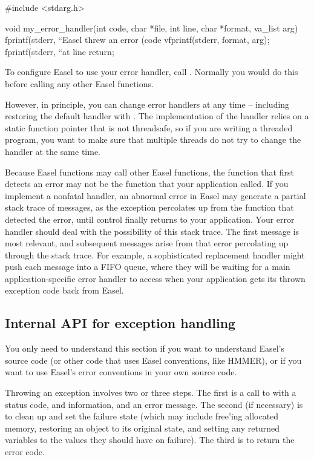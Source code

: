 \begin{cchunk}
#include <stdarg.h>

void
my_error_handler(int code, char *file, int line, char *format, va_list arg)
{
  fprintf(stderr, ``Easel threw an error (code %
  vfprintf(stderr, format, arg);
  fprintf(stderr, ``at line %
  return;
}
\end{cchunk}

To configure Easel to use your error handler, call
. Normally you
would do this before calling any other Easel functions.

However, in principle, you can change error handlers at any time --
including restoring the default handler with
.  The implementation of
the handler relies on a static function pointer that is not
threadsafe, so if you are writing a threaded program, you want to make
sure that multiple threads do not try to change the handler at the
same time.

Because Easel functions may call other Easel functions, the function
that first detects an error may not be the function that your
application called.  If you implement a nonfatal handler, an abnormal
error in Easel may generate a partial stack trace of
 messages, as the exception percolates up from the
function that detected the error, until control finally returns to
your application. Your error handler should deal with the possibility
of this stack trace. The first  message is most
relevant, and subsequent messages arise from that error percolating up
through the stack trace.  For example, a sophisticated replacement
 handler might push each 
message into a FIFO queue, where they will be waiting for a main
application-specific error handler to access when your application
gets its thrown exception code back from Easel.

\subsection{Internal API for exception handling}

You only need to understand this section if you want to understand
Easel's source code (or other code that uses Easel conventions, like
HMMER), or if you want to use Easel's error conventions in your own
source code.

Throwing an exception involves two or three steps. The first is a call
to  with a status code,  and
 information, and an error message. The second (if
necessary) is to clean up and set the failure state (which may include
free'ing allocated memory, restoring an object to its original state,
and setting any returned variables to the values they should have on
failure). The third is to return the error code.

